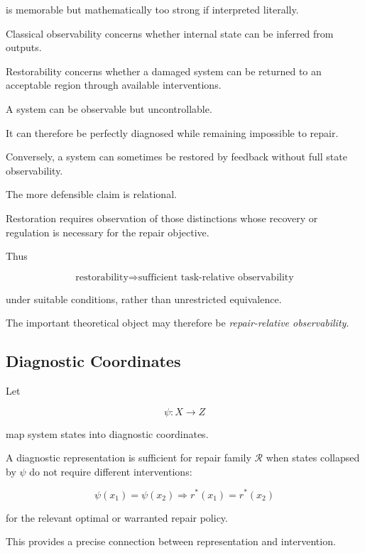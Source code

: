 \documentclass[11pt]{article}
\theoremstyle{remark}
\begin{document}
is memorable but mathematically too strong if interpreted literally.

Classical observability concerns whether internal state can be inferred from outputs.

Restorability concerns whether a damaged system can be returned to an acceptable region through available interventions.

A system can be observable but uncontrollable.

It can therefore be perfectly diagnosed while remaining impossible to repair.

Conversely, a system can sometimes be restored by feedback without full state observability.

The more defensible claim is relational.

Restoration requires observation of those distinctions whose recovery or regulation is necessary for the repair objective.

Thus

\begin{equation}
\text{restorability}
\Rightarrow
\text{sufficient task-relative observability}
\end{equation}

under suitable conditions, rather than unrestricted equivalence.

The important theoretical object may therefore be \emph{repair-relative observability}.

\subsection{Diagnostic Coordinates}

Let

\begin{equation}
\psi:X\rightarrow Z
\end{equation}

map system states into diagnostic coordinates.

A diagnostic representation is sufficient for repair family $\mathcal{R}$ when states collapsed by $\psi$ do not require different interventions:

\begin{equation}
\psi(x_1)=\psi(x_2)
\Rightarrow
r^\ast(x_1)=r^\ast(x_2)
\end{equation}

for the relevant optimal or warranted repair policy.

This provides a precise connection between representation and intervention.
\end{document}
